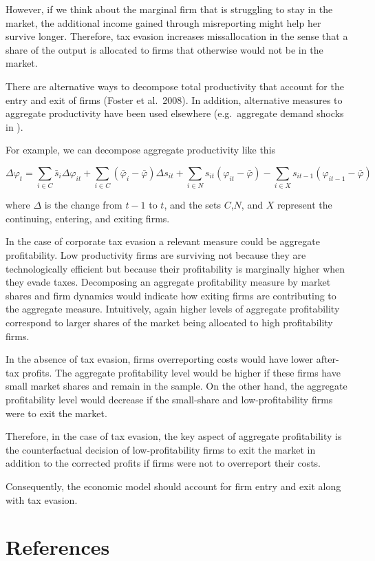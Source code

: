 \documentclass[
  12pt]{article}
\theoremstyle{definition}
\theoremstyle{remark}
\begin{document}
However, if we think about the marginal firm that is struggling to stay
in the market, the additional income gained through misreporting might
help her survive longer. Therefore, tax evasion increases missallocation
in the sense that a share of the output is allocated to firms that
otherwise would not be in the market.

There are alternative ways to decompose total productivity that account
for the entry and exit of firms (Foster et al.~2008). In addition,
alternative measures to aggregate productivity have been used elsewhere
(e.g.~aggregate demand shocks in \citet{Eslava2004}).

For example, we can decompose aggregate productivity like this

\[
\Delta\varphi_t = \sum_{i \in C}\bar s_i \Delta\varphi_{it} + \sum_{i\in C}(\bar\varphi_i-\bar\varphi)\Delta s_{it}+\sum_{i\in N} s_{it}\left(\varphi_{it}-\bar\varphi\right)-\sum_{i\in X}s_{it-1}\left(\varphi_{it-1}-\bar \varphi\right)
\]

where \(\Delta\) is the change from \(t-1\) to \(t\), and the sets
\(C\),\(N\), and \(X\) represent the continuing, entering, and exiting
firms.

In the case of corporate tax evasion a relevant measure could be
aggregate profitability. Low productivity firms are surviving not
because they are technologically efficient but because their
profitability is marginally higher when they evade taxes. Decomposing an
aggregate profitability measure by market shares and firm dynamics would
indicate how exiting firms are contributing to the aggregate measure.
Intuitively, again higher levels of aggregate profitability correspond
to larger shares of the market being allocated to high profitability
firms.

In the absence of tax evasion, firms overreporting costs would have
lower after-tax profits. The aggregate profitability level would be
higher if these firms have small market shares and remain in the sample.
On the other hand, the aggregate profitability level would decrease if
the small-share and low-profitability firms were to exit the market.

Therefore, in the case of tax evasion, the key aspect of aggregate
profitability is the counterfactual decision of low-profitability firms
to exit the market in addition to the corrected profits if firms were
not to overreport their costs.

Consequently, the economic model should account for firm entry and exit
along with tax evasion.

\section{References}\label{references}

\renewcommand{\bibsection}{}

\end{document}
